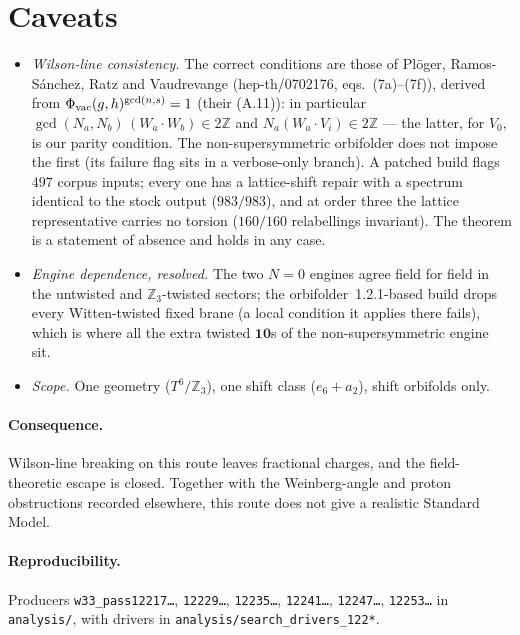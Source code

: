 \documentclass[11pt]{article}
\begin{document}
\section{Caveats}
\begin{itemize}
\item \emph{Wilson-line consistency.} The correct conditions are those of Pl\"oger, Ramos-S\'anchez, Ratz and Vaudrevange
(hep-th/0702176, eqs.~(7a)--(7f)), derived from $\Phi_{\rm vac}(g,h)^{\gcd(n,s)}=1$ (their (A.11)): in particular $\gcd(N_a,N_b)\,(W_a\cdot W_b)
\in2\mathbb Z$ and $N_a(W_a\cdot V_i)\in2\mathbb Z$ --- the latter, for $V_0$, is our parity condition. The non-supersymmetric orbifolder does not impose the first (its failure flag sits in a verbose-only branch). A patched build flags $497$ corpus inputs; every one has a lattice-shift repair with a spectrum identical to the stock output ($983/983$), and at order three the lattice representative carries no torsion ($160/160$ relabellings invariant). The theorem is a statement of absence and holds in any case.
\item \emph{Engine dependence, resolved.} The two $N=0$ engines agree field for field in the untwisted and $\mathbb Z_3$-twisted sectors; the orbifolder~1.2.1-based build drops every Witten-twisted fixed brane (a local condition it applies there fails), which is where all the extra twisted $\mathbf{10}$s of the non-supersymmetric engine sit.
\item \emph{Scope.} One geometry ($T^6/\mathbb Z_3$), one shift class ($e_6+a_2$), shift orbifolds only.
\end{itemize}

\paragraph{Consequence.} Wilson-line breaking on this route leaves fractional charges, and the field-theoretic escape is closed. Together
with the Weinberg-angle and proton obstructions recorded elsewhere, this route does not give a realistic Standard Model.

\paragraph{Reproducibility.} Producers \texttt{w33\_pass12217\ldots}, \texttt{12229\ldots}, \texttt{12235\ldots}, \texttt{12241\ldots},
\texttt{12247\ldots}, \texttt{12253\ldots} in \texttt{analysis/}, with drivers in \texttt{analysis/search\_drivers\_122*}.
\end{document}
